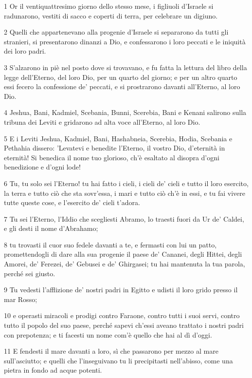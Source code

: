 \par 1 Or il ventiquattresimo giorno dello stesso mese, i figliuoli d'Israele si radunarono, vestiti di sacco e coperti di terra, per celebrare un digiuno.
\par 2 Quelli che appartenevano alla progenie d'Israele si separarono da tutti gli stranieri, si presentarono dinanzi a Dio, e confessarono i loro peccati e le iniquità dei loro padri.
\par 3 S'alzarono in piè nel posto dove si trovavano, e fu fatta la lettura del libro della legge dell'Eterno, del loro Dio, per un quarto del giorno; e per un altro quarto essi fecero la confessione de' peccati, e si prostrarono davanti all'Eterno, al loro Dio.
\par 4 Jeshua, Bani, Kadmiel, Scebania, Bunni, Scerebia, Bani e Kenani salirono sulla tribuna dei Leviti e gridarono ad alta voce all'Eterno, al loro Dio.
\par 5 E i Leviti Jeshua, Kadmiel, Bani, Hashabneia, Scerebia, Hodia, Scebania e Pethahia dissero: 'Levatevi e benedite l'Eterno, il vostro Dio, d'eternità in eternità! Si benedica il nome tuo glorioso, ch'è esaltato al disopra d'ogni benedizione e d'ogni lode!
\par 6 Tu, tu solo sei l'Eterno! tu hai fatto i cieli, i cieli de' cieli e tutto il loro esercito, la terra e tutto ciò che sta sovr'essa, i mari e tutto ciò ch'è in essi, e tu fai vivere tutte queste cose, e l'esercito de' cieli t'adora.
\par 7 Tu sei l'Eterno, l'Iddio che scegliesti Abramo, lo traesti fuori da Ur de' Caldei, e gli desti il nome d'Abrahamo;
\par 8 tu trovasti il cuor suo fedele davanti a te, e fermasti con lui un patto, promettendogli di dare alla sua progenie il paese de' Cananei, degli Hittei, degli Amorei, de' Ferezei, de' Gebusei e de' Ghirgasei; tu hai mantenuta la tua parola, perché sei giusto.
\par 9 Tu vedesti l'afflizione de' nostri padri in Egitto e udisti il loro grido presso il mar Rosso;
\par 10 e operasti miracoli e prodigi contro Faraone, contro tutti i suoi servi, contro tutto il popolo del suo paese, perché sapevi ch'essi aveano trattato i nostri padri con prepotenza; e ti facesti un nome com'è quello che hai al dì d'oggi.
\par 11 E fendesti il mare davanti a loro, sì che passarono per mezzo al mare sull'asciutto; e quelli che l'inseguivano tu li precipitasti nell'abisso, come una pietra in fondo ad acque potenti.
